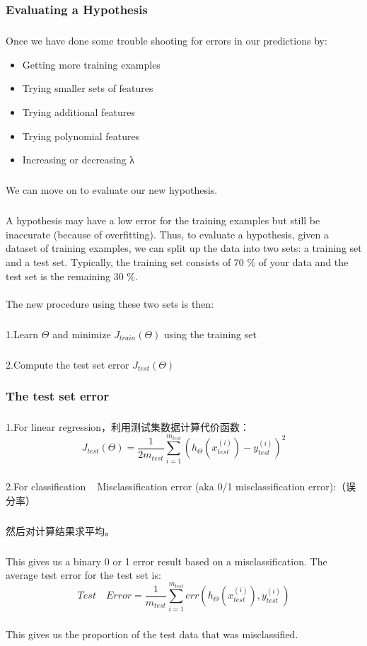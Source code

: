 \documentclass{article}
\begin{document}
\begin{CJK}{UTF8}{gbsn}
\subsubsection{Evaluating a Hypothesis}
\subparagraph{}
Once we have done some trouble shooting for errors in our predictions by: 
\begin{itemize}
\item Getting more training examples
\item Trying smaller sets of features
\item Trying additional features
\item Trying polynomial features
\item Increasing or decreasing λ
\end{itemize}
\subparagraph{}
We can move on to evaluate our new hypothesis. 
\subparagraph{}
A hypothesis may have a low error for the training examples but still be inaccurate (because of overfitting). Thus, to evaluate a hypothesis, given a dataset of training examples, we can split up the data into two sets: a training set and a test set. Typically, the training set consists of 70 \%{} of your data and the test set is the remaining 30 \%{}. 
\paragraph{}
The new procedure using these two sets is then:
\subparagraph{}
1.Learn $\Theta$ and minimize $J_{train}(\Theta)$ using the training set
\subparagraph{}
2.Compute the test set error $J_{test}(\Theta)$
\subsubsection{The test set error}
\subparagraph{}
1.For linear regression，利用测试集数据计算代价函数：
\begin{equation}
J_{test}(\Theta)=\frac{1}{2m_{test}}\sum_{i=1}^{m_{test}}(h_\Theta(x_{test}^{(i)})-y_{test}^{(i)})^2
\end{equation}
\subparagraph{}
2.For classification ~ Misclassification error (aka 0/1 misclassification error):（误分率）
\begin{figure}[H]
\label{fig:609}
\end{figure}
\subparagraph{}
然后对计算结果求平均。
\subparagraph{}
This gives us a binary 0 or 1 error result based on a misclassification. The average test error for the test set is:
\begin{equation}
{Test}\quad{Error}=\frac{1}{m_{test}}\sum_{i=1}^{m_{test}}err(h_\Theta(x_{test}^{(i)}),y_{test}^{(i)})
\end{equation}
\subparagraph{}
This gives us the proportion of the test data that was misclassified.

\end{CJK}
\end{document}
